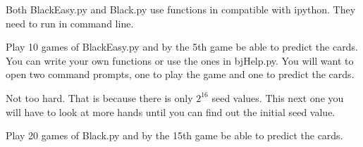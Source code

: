 \begin{warn}
Both BlackEasy.py and Black.py use functions in compatible with ipython. They need to run  in command line.
\end{warn}



\begin{problem}
Play 10 games of BlackEasy.py and by the 5th game be able to predict the cards.
You can write your own functions or use the ones in bjHelp.py.
You will want to open two command prompts, one to play the game and one to predict the cards. 
\end{problem}

Not too hard.
That is because there is only $2^{16}$ seed values.
This next one you will have to look at more hands until you can find out the initial seed value.

\begin{problem}
Play 20 games of Black.py and by the 15th game be able to predict the cards.
\end{problem}



